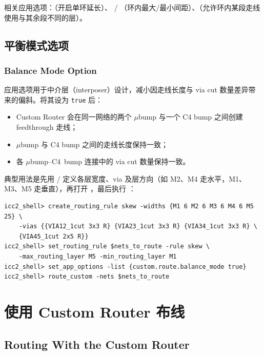 相关应用选项：（开启单环延长）、 / （环内最大/最小间距）、（允许环内某段走线使用与其余段不同的层）。

\subsection{平衡模式选项}
\subsubsection*{Balance Mode Option}

 应用选项用于中介层（interposer）设计，减小因走线长度与 via cut 数量差异带来的偏斜。将其设为 \texttt{true} 后：
\begin{itemize}
  \item Custom Router 会在同一网络的两个 $\mu$bump 与一个 C4 bump 之间创建 feedthrough 走线；
  \item $\mu$bump 与 C4 bump 之间的走线长度保持一致；
  \item 各 $\mu$bump--C4~bump 连接中的 via cut 数量保持一致。
\end{itemize}

典型用法是先用 / 定义各层宽度、via 及层方向（如 M2、M4 走水平，M1、M3、M5 走垂直），再打开 ，最后执行 ：

\begin{lstlisting}
icc2_shell> create_routing_rule skew -widths {M1 6 M2 6 M3 6 M4 6 M5 25} \
    -vias {{VIA12_1cut 3x3 R} {VIA23_1cut 3x3 R} {VIA34_1cut 3x3 R} \
    {VIA45_1cut 2x5 R}}
icc2_shell> set_routing_rule $nets_to_route -rule skew \
    -max_routing_layer M5 -min_routing_layer M1
icc2_shell> set_app_options -list {custom.route.balance_mode true}
icc2_shell> route_custom -nets $nets_to_route
\end{lstlisting}

\section{使用 Custom Router 布线}
\subsection*{Routing With the Custom Router}


